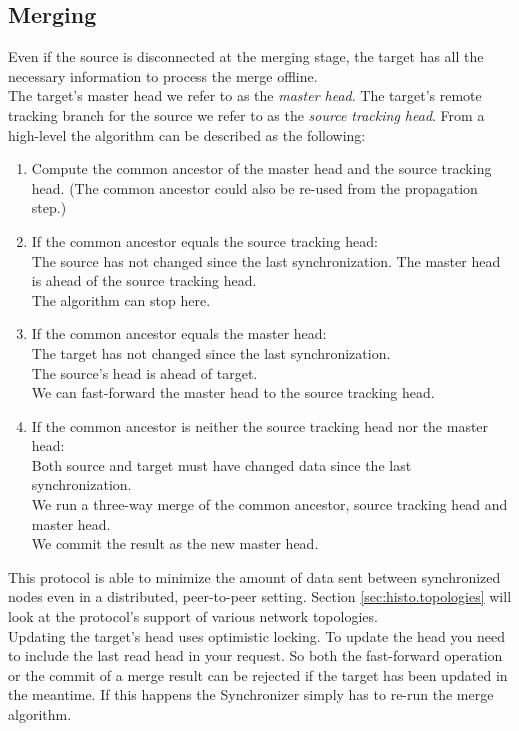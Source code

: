 \subsection{Merging}
\label{sec:histo.protocol.merging}
Even if the source is disconnected at the merging stage, the target has all the necessary information to process the merge offline.\\

The target's master head we refer to as the \emph{master head}.
The target's remote tracking branch for the source we refer to as the \emph{source tracking head}.
From a high-level the algorithm can be described as the following:\\

\begin{enumerate}
\item Compute the common ancestor of the master head and the source tracking head. (The common ancestor could also be re-used from the propagation step.)
\item If the common ancestor equals the source tracking head:\\
  The source has not changed since the last synchronization. The master head is ahead of the source tracking head.\\
  The algorithm can stop here.
\item If the common ancestor equals the master head:\\
  The target has not changed since the last synchronization.\\
  The source's head is ahead of target.\\
  We can fast-forward the master head to the source tracking head.
\item If the common ancestor is neither the source tracking head nor the master head:\\
  Both source and target must have changed data since the last synchronization.\\
  We run a three-way merge of the common ancestor, source tracking head and master head.\\
  We commit the result as the new master head.
\end{enumerate}

This protocol is able to minimize the amount of data sent between synchronized
nodes even in a distributed, peer-to-peer setting.
Section \ref{sec:histo.topologies} will look at the protocol's support of various network topologies.\\

Updating the target's head uses optimistic locking.
To update the head you need to include the last read head in your request.
So both the fast-forward operation or the commit of a merge result can be rejected if the target has been updated in the meantime.
If this happens the Synchronizer simply has to re-run the merge algorithm.\\

